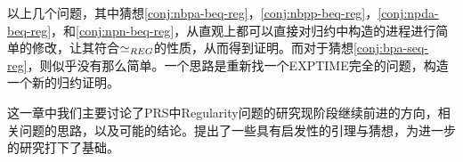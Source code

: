 以上几个问题，其中猜想\ref{conj:nbpa-beq-reg}，\ref{conj:nbpp-beq-reg}，\ref{conj:npda-beq-reg}，和\ref{conj:npn-beq-reg}，从直观上都可以直接对归约中构造的进程进行简单的修改，让其符合$\simeq_{REG}$的性质，从而得到证明。而对于猜想\ref{conj:bpa-seq-reg}，则似乎没有那么简单。一个思路是重新找一个EXPTIME完全的问题，构造一个新的归约证明。

这一章中我们主要讨论了PRS中Regularity问题的研究现阶段继续前进的方向，相关问题的思路，以及可能的结论。提出了一些具有启发性的引理与猜想，为进一步的研究打下了基础。
